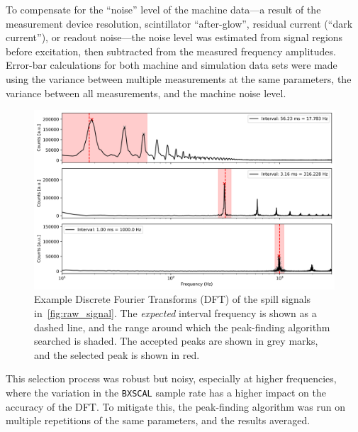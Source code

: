 \documentclass[a4paper,twoside,11pt]{report}
\begin{document}
To compensate for the ``noise'' level of the machine data---a result of the measurement device resolution, scintillator ``after-glow'', residual current (``dark current''), or readout noise---the noise level was estimated from signal regions before excitation, then subtracted from the measured frequency amplitudes. Error-bar calculations for both machine and simulation data sets were made using the variance between multiple measurements at the same parameters, the variance between all measurements, and the machine noise level.

\begin{figure}
  \centering
  \includegraphics*[width=0.8\linewidth]{raw_ffts.png}
  \caption[Example Fourier transforms of spill signals]{Example Discrete Fourier Transforms (DFT) of the spill signals in~\autoref{fig:raw_signal}. The \textit{expected} interval frequency is shown as a dashed line, and the range around which the peak-finding algorithm searched is shaded. The accepted peaks are shown in grey marks, and the selected peak is shown in red.}\label{fig:raw_ffts}
\end{figure}

This selection process was robust but noisy, especially at higher frequencies, where the variation in the \verb|BXSCAL| sample rate has a higher impact on the accuracy of the DFT. To mitigate this, the peak-finding algorithm was run on multiple repetitions of the same parameters, and the results averaged.
\end{document}
